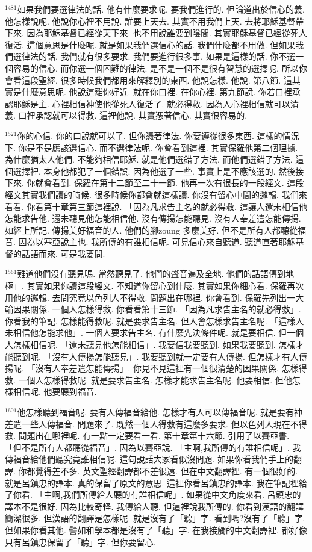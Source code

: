 \documentclass{book}
\begin{document}
$^{1481}$如果我們要選律法的話.
他有什麼要求呢.
要我們進行的.
但論道出於信心的義.
他怎樣說呢.
他說你心裡不用說.
誰要上天去.
其實不用我們上天.
去將耶穌基督帶下來.
因為耶穌基督已經從天下來.
也不用說誰要到陰間.
其實耶穌基督已經從死人復活.
這個意思是什麼呢.
就是如果我們選信心的話.
我們什麼都不用做.
但如果我們選律法的話.
我們就有很多要求.
我們要進行很多事.
如果是這樣的話.
你不選一個容易的信心.
而你選一個困難的律法.
是不是一個不是很有智慧的選擇呢.
所以你會看這段聖經.
很多時候我們都用來解釋別的東西.
他說怎樣.
他說.
第八節.
這其實是什麼意思呢.
他說這離你好近.
就在你口裡.
在你心裡.
第九節說.
你若口裡承認耶穌是主.
心裡相信神使他從死人復活了.
就必得救.
因為人心裡相信就可以清義.
口裡承認就可以得救.
這裡他說.
其實憑著信心.
其實很容易的.

$^{1521}$你的心信.
你的口說就可以了.
但你憑著律法.
你要遵從很多東西.
這樣的情況下.
你是不是應該選信心.
而不選律法呢.
你會看到這裡.
其實保羅他第二個理據.
為什麼猶太人他們.
不能夠相信耶穌.
就是他們選錯了方法.
而他們選錯了方法.
這個選擇裡.
本身他都犯了一個錯誤.
因為他選了一些.
事實上是不應該選的.
然後接下來.
你就會看到.
保羅在第十二節至二十一節.
他再一次有很長的一段經文.
這段經文其實我們讀的時候.
很多時候你都會就這樣讀.
你沒有留心中間的邏輯.
我們來看看.
你看第十章第三節這裡說.
「因為凡求告主名的就必得救.
這讓人還未相信他怎能求告他.
還未聽見他怎能相信他.
沒有傳揚怎能聽見.
沒有人奉差遣怎能傳揚.
如經上所記.
傳揚美好福音的人.
他們的腳zoung 多麼美好.
但不是所有人都聽從福音.
因為以塞亞說主也.
我所傳的有誰相信呢.
可見信心來自聽道.
聽道直著耶穌基督的話語而來.
可是我要問.

$^{1561}$難道他們沒有聽見嗎.
當然聽見了.
他們的聲音遍及全地.
他們的話語傳到地極」.
其實如果你讀這段經文.
不知道你留心到什麼.
其實如果你細心看.
保羅再次用他的邏輯.
去問究竟以色列人不得救.
問題出在哪裡.
你會看到.
保羅先列出一大輪因果關係.
一個人怎樣得救.
你看看第十三節.
「因為凡求告主名的就必得救」.
你看我的筆記.
怎樣能得救呢.
就是要求告主名.
但人會怎樣求告主名呢.
「這樣人未相信他怎能求他」.
一個人要求告主名.
有什麼先決條件呢.
就是要相信.
但一個人怎樣相信呢.
「還未聽見他怎能相信」.
我要信我要聽到.
如果我要聽到.
怎樣才能聽到呢.
「沒有人傳揚怎能聽見」.
我要聽到就一定要有人傳揚.
但怎樣才有人傳揚呢.
「沒有人奉差遣怎能傳揚」.
你見不見這裡有一個很清楚的因果關係.
怎樣得救.
一個人怎樣得救呢.
就是要求告主名.
怎樣才能求告主名呢.
他要相信.
但他怎樣相信呢.
他要聽到福音.

$^{1601}$他怎樣聽到福音呢.
要有人傳福音給他.
怎樣才有人可以傳福音呢.
就是要有神差遣一些人傳福音.
問題來了.
既然一個人得救有這麼多要求.
但以色列人現在不得救.
問題出在哪裡呢.
有一點一定要看一看.
第十章第十六節.
引用了以賽亞書.
「但不是所有人都聽從福音」.
因為以賽亞說.
「主啊,我所傳的有誰相信呢」.
我傳福音給他們聽究竟誰相信呢.
這句說話大家看似沒問題.
如果你看我們手上的翻譯.
你都覺得差不多.
英文聖經翻譯都不差很遠.
但在中文翻譯裡.
有一個很好的.
就是呂鎮忠的譯本.
真的保留了原文的意思.
這裡你看呂鎮忠的譯本.
我在筆記裡給了你看.
「主啊,我們所傳給人聽的有誰相信呢」.
如果從中文角度來看.
呂鎮忠的譯本不是很好.
因為比較奇怪.
我傳給人聽.
但這裡說我所傳的.
你看到漢語的翻譯簡潔很多.
但漢語的翻譯是怎樣呢.
就是沒有了「聽」字.
看到嗎?沒有了「聽」字.
但如果你看其他.
譬如和學本都是沒有了「聽」字.
在我接觸的中文翻譯裡.
都好像只有呂鎮忠保留了「聽」字.
但你要留心.
\end{document}
